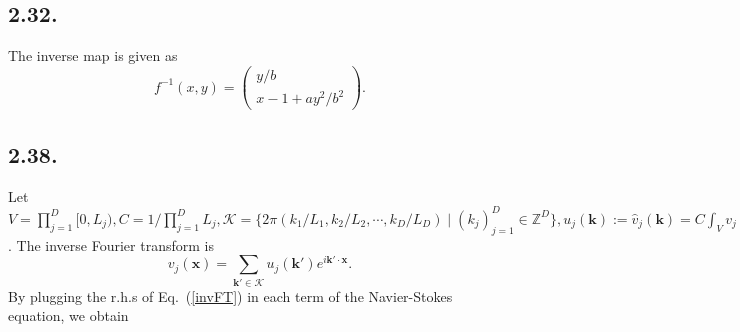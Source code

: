 \documentclass[a4paper,11pt,fleqn]{article}
\begin{document}
\subsection{2.32.}
The inverse map is given as
\begin{equation}
    f^{-1}(x,y) =\left(\begin{array}{c}
        y/b \\
        x -1 + ay^2/b^2
    \end{array} \right) .
\end{equation}
\hruleskip

\subsection{2.38.}
Let $V = \prod_{j=1}^D[0,L_j), C = 1/\prod_{j=1}^D{L_j}, \mathcal{K} = \{ 2\pi (k_1/L_1, k_2/L_2, \cdots, k_D/L_D) \mid (k_j)_{j=1}^D \in \mathbb{Z}^D\}, u_j({\bm k}):=\hat{v}_j({\bm k})=C \int_V{v_j({\bm x})e^{-i{\bm k}\cdot{\bm x}}\mathbf{d}^D{\bm x}}$. The inverse Fourier transform is 
\begin{equation}
    v_j({\bm x})=\sum_{{\bm k}'\in \mathcal{K}}{u_j({\bm k}')e^{i{\bm k}'\cdot{\bm x}}}. \label{invFT}
\end{equation} 
By plugging the r.h.s of Eq.~(\ref{invFT}) in each term of the Navier-Stokes equation, we obtain 
\end{document}

